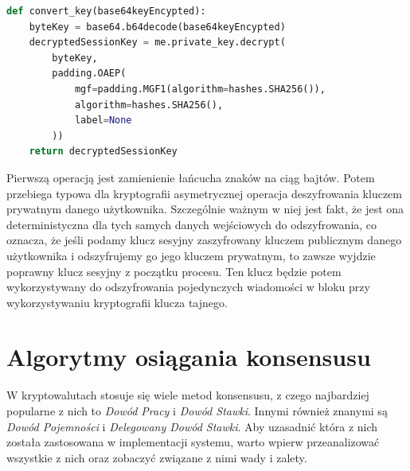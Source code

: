 \begin{lstlisting}[language=Python, extendedchars=true, caption={Funkcja konwertująca klucz}, label={lst:KonwersjaKlucza}]
def convert_key(base64keyEncypted):
    byteKey = base64.b64decode(base64keyEncypted)
    decryptedSessionKey = me.private_key.decrypt(
        byteKey,
        padding.OAEP(
            mgf=padding.MGF1(algorithm=hashes.SHA256()),
            algorithm=hashes.SHA256(),
            label=None
        ))
    return decryptedSessionKey
\end{lstlisting}
Pierwszą operacją jest zamienienie łańcucha znaków na ciąg bajtów. Potem przebiega typowa dla kryptografii asymetrycznej operacja deszyfrowania kluczem prywatnym danego użytkownika. Szczególnie ważnym w niej jest fakt, że jest ona deterministyczna dla tych samych danych wejściowych do odszyfrowania, co oznacza, że jeśli podamy klucz sesyjny zaszyfrowany kluczem publicznym danego użytkownika i odszyfrujemy go jego kluczem prywatnym, to zawsze wyjdzie poprawny klucz sesyjny z początku procesu. Ten klucz będzie potem wykorzystywany do odszyfrowania pojedynczych wiadomości w bloku przy wykorzystywaniu kryptografii klucza tajnego.

\section{Algorytmy osiągania konsensusu}
\label{sec:Konsensus}
W kryptowalutach stosuje się wiele metod konsensusu, z czego najbardziej popularne z nich to \textit{Dowód Pracy} i \textit{Dowód Stawki}. Innymi również znanymi są \textit{Dowód Pojemności} i \textit{Delegowany Dowód Stawki}. Aby uzasadnić która z nich została zastosowana w implementacji systemu, warto wpierw przeanalizować wszystkie z nich oraz zobaczyć związane z nimi wady i zalety.
